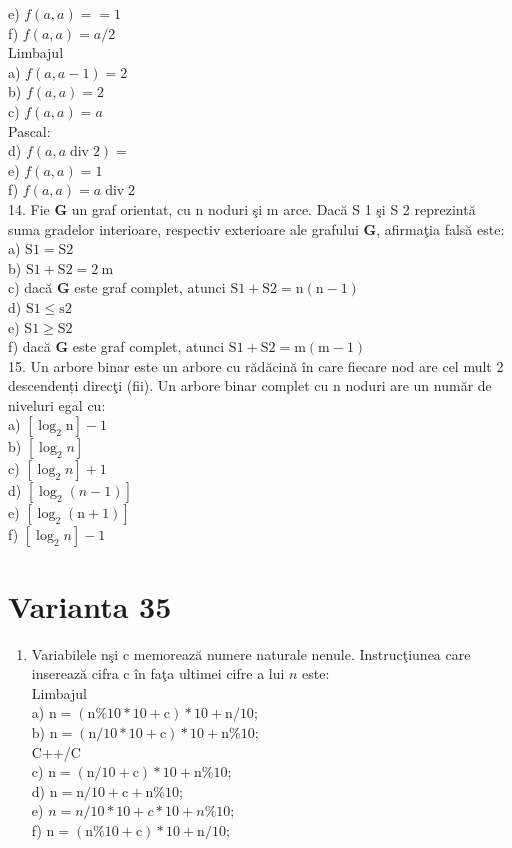 e) $f(a, a)==1$\\
f) $f(a, a)=a / 2$\\
Limbajul\\
a) $f(a, a-1)=2$\\
b) $f(a, a)=2$\\
c) $f(a, a)=a$\\
Pascal:\\
d) $f(a, a \operatorname{div} 2)=$\\
e) $f(a, a)=1$\\
f) $f(a, a)=a \operatorname{div} 2$\\
14. Fie $\mathbf{G}$ un graf orientat, cu n noduri şi m arce. Dacă S 1 şi S 2 reprezintă suma gradelor interioare, respectiv exterioare ale grafului $\mathbf{G}$, afirmaţia falsă este:\\
a) $\mathrm{S} 1=\mathrm{S} 2$\\
b) $\mathrm{S} 1+\mathrm{S} 2=2 \mathrm{~m}$\\
c) dacă $\mathbf{G}$ este graf complet, atunci $\mathrm{S} 1+\mathrm{S} 2=\mathrm{n}(\mathrm{n}-1)$\\
d) $\mathrm{S} 1 \leq \mathrm{s} 2$\\
e) $\mathrm{S} 1 \geq \mathrm{S} 2$\\
f) dacă $\mathbf{G}$ este graf complet, atunci $\mathrm{S} 1+\mathrm{S} 2=\mathrm{m}(\mathrm{m}-1)$\\
15. Un arbore binar este un arbore cu rădăcină în care fiecare nod are cel mult 2 descendenți direcţi (fii). Un arbore binar complet cu n noduri are un număr de niveluri egal cu:\\
a) $\left[\log _{2} \mathrm{n}\right]-1$\\
b) $\left[\log _{2} n\right]$\\
c) $\left[\log _{2} n\right]+1$\\
d) $\left[\log _{2}(n-1)\right]$\\
e) $\left[\log _{2}(\mathrm{n}+1)\right]$\\
f) $\left[\log _{2} n\right]-1$

\section*{Varianta 35}
\begin{enumerate}
  \item Variabilele nşi c memorează numere naturale nenule. Instrucţiunea care inserează cifra c în faţa ultimei cifre a lui $n$ este:\\
Limbajul\\
a) $\mathrm{n}=(\mathrm{n} \% 10 * 10+\mathrm{c}) * 10+\mathrm{n} / 10$;\\
b) $\mathrm{n}=(\mathrm{n} / 10 * 10+\mathrm{c}) * 10+\mathrm{n} \% 10$;\\
C++/C\\
c) $\mathrm{n}=(\mathrm{n} / 10+\mathrm{c}) * 10+\mathrm{n} \% 10$;\\
d) $\mathrm{n}=\mathrm{n} / 10+\mathrm{c}+\mathrm{n} \% 10$;\\
e) $n=n / 10 * 10+c * 10+n \% 10$;\\
f) $\mathrm{n}=(\mathrm{n} \% 10+\mathrm{c}) * 10+\mathrm{n} / 10$;
\end{enumerate}

